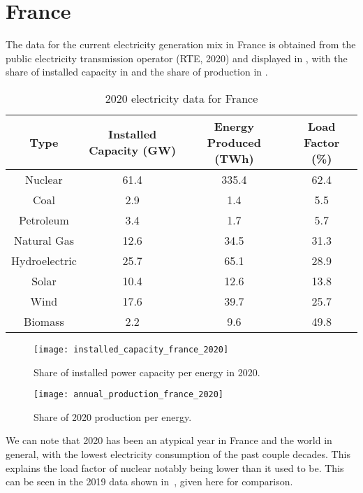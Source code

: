\section{France}

The data for the current electricity generation mix in France is obtained from the public electricity transmission operator (RTE, 2020) and displayed in , with the share of installed capacity in  and the share of production in .

\begin{table*}[ht]
\caption[2020 electricity data for France]{2020 electricity data for France}
\begin{tabular}{ c c c c }
	\toprule
	Type & Installed Capacity (GW) & Energy Produced (TWh) & Load Factor (\%) \\
	\midrule
	Nuclear & 61.4 & 335.4 & 62.4\\
	Coal & 2.9 & 1.4 & 5.5\\
	Petroleum & 3.4 & 1.7 & 5.7\\
	Natural Gas & 12.6 & 34.5 & 31.3\\
	Hydroelectric & 25.7 & 65.1 & 28.9\\
	Solar & 10.4 & 12.6 & 13.8\\
	Wind & 17.6 & 39.7 & 25.7\\
	Biomass & 2.2 & 9.6 & 49.8\\
	\bottomrule
\end{tabular}
\end{table*}


\begin{figure}[h]
	\texttt{[image: installed\_capacity\_france\_2020]}
	\caption[Share of installed power capacity per energy]{Share of installed power capacity per energy in 2020.}
\end{figure}


\begin{figure}[h]
	\texttt{[image: annual\_production\_france\_2020]}
	\caption[Share of 2020 production per energy]{Share of 2020 production per energy.}
\end{figure}



We can note that 2020 has been an atypical year in France and the world in general, with the lowest electricity consumption of the past couple decades. This explains the load factor of nuclear notably being lower than it used to be. This can be seen in the 2019 data shown in~, given here for comparison.

